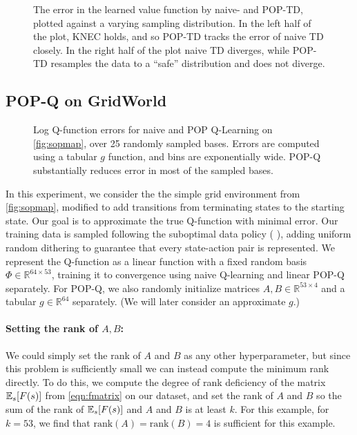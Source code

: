\label{sec:threestateexp}
\begin{figure}[t]
  \centering
  
  \caption{The error in the learned value function by naive- and POP-TD, plotted against a varying sampling distribution. In the left half of the plot, KNEC holds, and so POP-TD tracks the error of naive TD closely. In the right half of the plot naive TD diverges, while POP-TD resamples the data to a ``safe'' distribution and does not diverge. }
  \label{fig:threestate}
\end{figure}


\subsection{POP-Q on GridWorld}

\label{sec:expsimpleoffpolicy}
\begin{figure}[t]
  \centering
  
  \caption{Log Q-function errors for naive and POP Q-Learning on \cref{fig:sopmap}, over 25 randomly sampled bases. Errors are computed using a tabular $g$ function, and bins are exponentially wide. POP-Q substantially reduces error in most of the sampled bases. }
  \label{fig:soperr}
\end{figure}

In this experiment, we consider the the simple grid environment from \cref{fig:sopmap}, modified to add transitions from terminating states to the starting state. Our goal is to approximate the true Q-function with minimal error. Our training data is sampled following the suboptimal data policy ({\color{datapolicy} \datapolicyglyph}), adding uniform random dithering to guarantee that every state-action pair is represented.
We represent the Q-function as a linear function with a fixed random basis $\Phi \in \mathbb R^{64\times 53}$, training it to convergence using naive Q-learning and linear POP-Q separately. For POP-Q, we also randomly initialize matrices $A, B \in \mathbb R^{53\times 4}$ and a tabular $g \in \mathbb R^{64}$ separately. (We will later consider an approximate $g$.)

\paragraph{Setting the rank of $A, B$:}
We could simply set the rank of $A$ and $B$ as any other hyperparameter, but since this problem is sufficiently small we can instead compute the minimum rank directly. To do this, we compute the degree of rank deficiency of the matrix $\mathbb{E}_s [F(s)]$ from \cref*{eqn:fmatrix} on our dataset, and set the rank of $A$ and $B$ so the sum of the rank of $\mathbb{E}_s [F(s)]$ and $A$ and $B$ is at least $k$. For this example, for $k=53$, we find that $\text{rank} (A) = \text{rank} (B) = 4$ is sufficient for this example.

